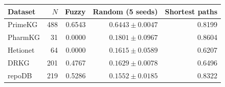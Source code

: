 \begin{tabular}{lrrrr}
\toprule
Dataset & $N$ & Fuzzy & Random (5 seeds) & Shortest paths \\
\midrule
PrimeKG & 488 & 0.6543 & $0.6443\pm0.0047$ & 0.8199 \\
PharmKG & 31 & 0.0000 & $0.1801\pm0.0967$ & 0.8604 \\
Hetionet & 64 & 0.0000 & $0.1615\pm0.0589$ & 0.6207 \\
DRKG & 201 & 0.4767 & $0.1629\pm0.0078$ & 0.6496 \\
repoDB & 219 & 0.5286 & $0.1552\pm0.0185$ & 0.8322 \\
\bottomrule
\end{tabular}
